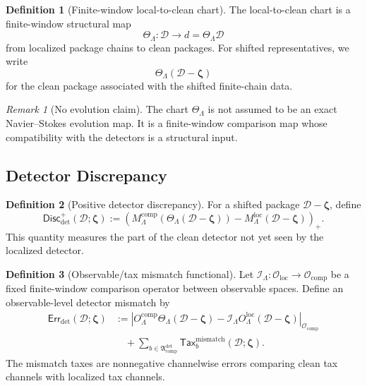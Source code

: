 \documentclass[11pt]{article}
\numberwithin{equation}{section}
\theoremstyle{definition}
\newtheorem{definition}[definition]{Definition}
\theoremstyle{remark}
\newtheorem{remark}[remark]{Remark}
\newcommand{\loc}{\mathrm{loc}}
\newcommand{\comp}{\mathrm{comp}}
\newcommand{\detc}{\mathrm{det}}
\newcommand{\Err}{\mathsf{Err}}
\newcommand{\Disc}{\mathsf{Disc}}
\newcommand{\Tax}{\mathsf{Tax}}
\newcommand{\calD}{\mathcal D}
\newcommand{\calO}{\mathcal O}
\newcommand{\bzeta}{\boldsymbol\zeta}
\begin{document}
\begin{definition}[Finite-window local-to-clean chart]
\label{def:chart}
The local-to-clean chart is a finite-window structural map
\[
    \Theta_{\Lambda}:\calD\longrightarrow d=\Theta_{\Lambda}\calD
\]
from localized package chains to clean packages.  For shifted representatives,
we write
\[
    \Theta_{\Lambda}(\calD-\bzeta)
\]
for the clean package associated with the shifted finite-chain data.
\end{definition}

\begin{remark}[No evolution claim]
The chart \(\Theta_{\Lambda}\) is not assumed to be an exact Navier--Stokes
evolution map.  It is a finite-window comparison map whose compatibility with
the detectors is a structural input.
\end{remark}

\subsection{Detector Discrepancy}
\label{sec:discrepancy}

\begin{definition}[Positive detector discrepancy]
\label{def:positive-detector-discrepancy}
For a shifted package \(\calD-\bzeta\), define
\[
    \Disc_{\detc}^{+}(\calD;\bzeta)
    :=
    \left(
        M_{\Lambda}^{\comp}(\Theta_{\Lambda}(\calD-\bzeta))
        -
        M_{\Lambda}^{\loc}(\calD-\bzeta)
    \right)_+.
\]
This quantity measures the part of the clean detector not yet seen by the
localized detector.
\end{definition}

\begin{definition}[Observable/tax mismatch functional]
\label{def:detector-mismatch}
Let \(\mathcal I_{\Lambda}:\calO_{\loc}\to\calO_{\comp}\) be a fixed
finite-window comparison operator between observable spaces.  Define an
observable-level detector mismatch by
\[
\begin{aligned}
    \Err_{\detc}(\calD;\bzeta)
    &:=
    \left|
        O_{\Lambda}^{\comp}\Theta_{\Lambda}(\calD-\bzeta)
        -
        \mathcal I_{\Lambda}O_{\Lambda}^{\loc}(\calD-\bzeta)
    \right|_{\calO_{\comp}}\\
    &\quad+
    \sum_{b\in\mathfrak A_{\comp}^{\detc}}
    \Tax_b^{\mathrm{mismatch}}(\calD;\bzeta).
\end{aligned}
\]
The mismatch taxes are nonnegative channelwise errors comparing clean tax
channels with localized tax channels.
\end{definition}
\end{document}
